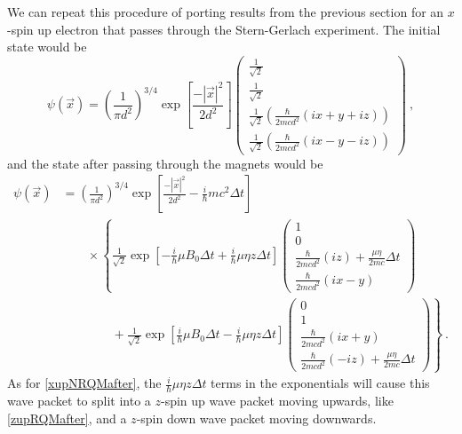 \documentclass[onecolumn,secnumarabic,amsmath,amssymb,balancelastpage,nofootinbib]{article}
\begin{document}
We can repeat this procedure of porting results from the previous section for an $x$-spin up electron that passes through the Stern-Gerlach experiment.  The initial state would be
\begin{equation}
\psi(\vec{x}) = \left(\frac{1}{\pi d^2}\right)^{3/4}  \exp\left[\frac{-|\vec{x}|^2}{2 d^2}\right] \left(\begin{matrix} \frac{1}{\sqrt{2}}\\\frac{1}{\sqrt{2}}\\ \frac{1}{\sqrt{2}}\left(\frac{\hbar}{2 m c d^2}(ix+y+iz)\right) \\ \frac{1}{\sqrt{2}} \left(\frac{\hbar}{2 m c d^2}(i x-y-iz)\right)\end{matrix}\right)
\ ,
\label{xupRQM}
\end{equation}
and the state after passing through the magnets would be
\begin{align}
\psi(\vec{x}) &= \left(\frac{1}{\pi d^2}\right)^{3/4}  \exp\left[\frac{-|\vec{x}|^2}{2 d^2} -\frac{i}{\hbar} m c^2 \Delta t\right]
\nonumber
\\
&\quad\quad\times\left\{
 \frac{1}{\sqrt{2}}\exp\left[-\frac{i}{\hbar}\mu B_0 \Delta t + \frac{i}{\hbar}\mu \eta z \Delta t\right]  \left(\begin{matrix}
 1 \\
 0 \\
 \frac{\hbar}{2 m c d^2}(iz) + \frac{\mu \eta}{2 m c} \Delta t \\
 \frac{\hbar}{2 m c d^2}(i x-y)
 \end{matrix}\right)\right.
 \nonumber
\\
&\quad\quad\quad\quad+
\left.
 \frac{1}{\sqrt{2}}\exp\left[\frac{i}{\hbar}\mu B_0 \Delta t - \frac{i}{\hbar}\mu \eta z \Delta t\right]  \left(\begin{matrix}
 0 \\
 1 \\
 \frac{\hbar}{2 m c d^2}(ix+y)  \\
 \frac{\hbar}{2 m c d^2}(-iz) + \frac{\mu \eta}{2 m c} \Delta t
 \end{matrix}\right)
\right\}
\ .
\label{xupRQMafter}
\end{align}
As for \eqref{xupNRQMafter}, the $\frac{i}{\hbar}\mu \eta z \Delta t$ terms in the exponentials will cause this wave packet to split into a $z$-spin up wave packet moving upwards, like \eqref{zupRQMafter}, and a $z$-spin down wave packet moving downwards.
\end{document}
